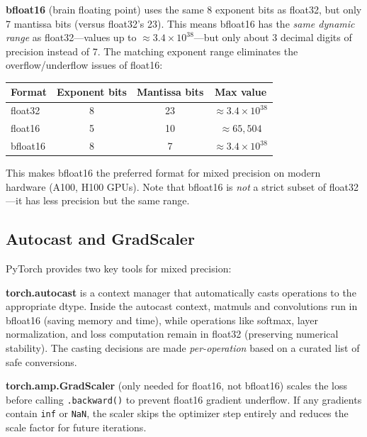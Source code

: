 \textbf{bfloat16} (brain floating point) uses the same 8 exponent bits as float32, but only 7 mantissa bits (versus float32's 23). This means bfloat16 has the \emph{same dynamic range} as float32---values up to $\approx 3.4 \times 10^{38}$---but only about 3 decimal digits of precision instead of 7. The matching exponent range eliminates the overflow/underflow issues of float16:
\begin{center}
\begin{tabular}{lccc}
\toprule
\textbf{Format} & \textbf{Exponent bits} & \textbf{Mantissa bits} & \textbf{Max value} \\
\midrule
float32 & 8 & 23 & $\approx 3.4 \times 10^{38}$ \\
float16 & 5 & 10 & $\approx 65{,}504$ \\
bfloat16 & 8 & 7 & $\approx 3.4 \times 10^{38}$ \\
\bottomrule
\end{tabular}
\end{center}
This makes bfloat16 the preferred format for mixed precision on modern hardware (A100, H100 GPUs). Note that bfloat16 is \emph{not} a strict subset of float32---it has less precision but the same range.

\subsection{Autocast and GradScaler}

PyTorch provides two key tools for mixed precision:

\textbf{torch.autocast} is a context manager that automatically casts operations to the appropriate dtype. Inside the autocast context, matmuls and convolutions run in bfloat16 (saving memory and time), while operations like softmax, layer normalization, and loss computation remain in float32 (preserving numerical stability). The casting decisions are made \emph{per-operation} based on a curated list of safe conversions.

\textbf{torch.amp.GradScaler} (only needed for float16, not bfloat16) scales the loss before calling \texttt{.backward()} to prevent float16 gradient underflow. If any gradients contain \texttt{inf} or \texttt{NaN}, the scaler skips the optimizer step entirely and reduces the scale factor for future iterations.

